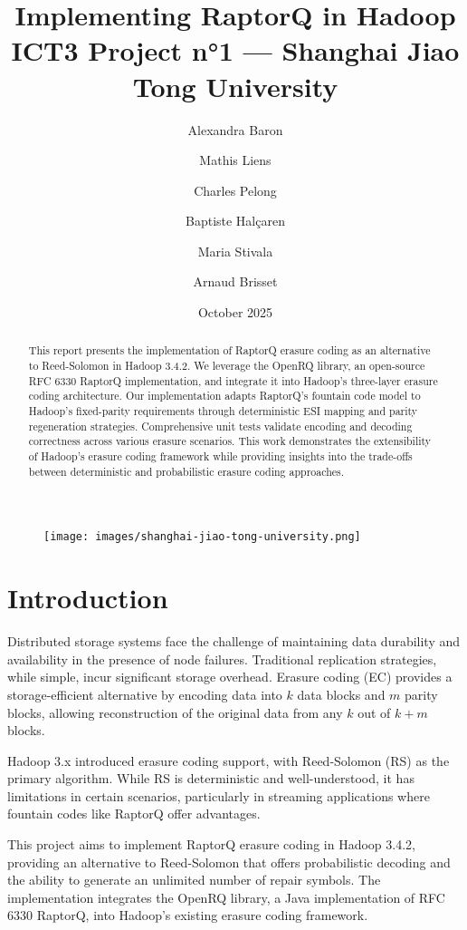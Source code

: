 \documentclass{article}
\title{Implementing RaptorQ in Hadoop\\
\large ICT3 Project n°1 — Shanghai Jiao Tong University}
\author{Alexandra Baron \and Mathis Liens \and Charles Pelong\and Baptiste Halçaren \and Maria Stivala \and Arnaud Brisset}
\date{October 2025}
\begin{document}
\maketitle

\begin{figure}[htbp]
\centering
\texttt{[image: images/shanghai-jiao-tong-university.png]}
\end{figure}

\begin{abstract}
This report presents the implementation of RaptorQ erasure coding as an alternative to Reed-Solomon in Hadoop 3.4.2. We leverage the OpenRQ library, an open-source RFC 6330 RaptorQ implementation, and integrate it into Hadoop's three-layer erasure coding architecture. Our implementation adapts RaptorQ's fountain code model to Hadoop's fixed-parity requirements through deterministic ESI mapping and parity regeneration strategies. Comprehensive unit tests validate encoding and decoding correctness across various erasure scenarios. This work demonstrates the extensibility of Hadoop's erasure coding framework while providing insights into the trade-offs between deterministic and probabilistic erasure coding approaches.
\end{abstract}

\section{Introduction}

Distributed storage systems face the challenge of maintaining data durability and availability in the presence of node failures. Traditional replication strategies, while simple, incur significant storage overhead. Erasure coding (EC) provides a storage-efficient alternative by encoding data into $k$ data blocks and $m$ parity blocks, allowing reconstruction of the original data from any $k$ out of $k+m$ blocks.

Hadoop 3.x introduced erasure coding support, with Reed-Solomon (RS) as the primary algorithm. While RS is deterministic and well-understood, it has limitations in certain scenarios, particularly in streaming applications where fountain codes like RaptorQ offer advantages.

This project aims to implement RaptorQ erasure coding in Hadoop 3.4.2, providing an alternative to Reed-Solomon that offers probabilistic decoding and the ability to generate an unlimited number of repair symbols. The implementation integrates the OpenRQ library, a Java implementation of RFC 6330 RaptorQ, into Hadoop's existing erasure coding framework.
\end{document}
